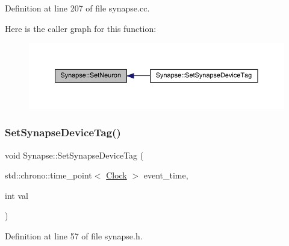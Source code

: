 Definition at line 207 of file synapse.\+cc.

Here is the caller graph for this function\+:\nopagebreak
\begin{figure}[H]
\begin{center}
\leavevmode
\includegraphics[width=350pt]{class_synapse_a278f054df3f4ff25683787ba8fe78263_icgraph}
\end{center}
\end{figure}
\mbox{\label{class_synapse_a702c08b1ee4389382a5890d8c19aee9c}} 
\subsubsection{\texorpdfstring{Set\+Synapse\+Device\+Tag()}{SetSynapseDeviceTag()}}
{\footnotesize\ttfamily void Synapse\+::\+Set\+Synapse\+Device\+Tag (\begin{DoxyParamCaption}\item[{std\+::chrono\+::time\+\_\+point$<$ \hyperlink{universe_8h_a0ef8d951d1ca5ab3cfaf7ab4c7a6fd80}{Clock} $>$}]{event\+\_\+time,  }\item[{int}]{val }\end{DoxyParamCaption})\hspace{0.3cm}{\ttfamily [inline]}}



Definition at line 57 of file synapse.\+h.

